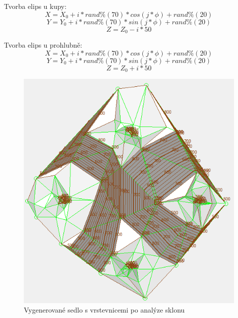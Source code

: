 \documentclass[a4paper,11pt,twoside]{article}
\begin{document}
Tvorba elips u kupy:
$$
X = X_0 + i * rand\%(70) * cos(j*\phi) + rand\%(20)
$$
$$
Y =  Y_0 + i * rand\%(70) * sin(j*\phi) + rand\%(20)
$$
$$
Z = Z_0 - i * 50
$$

Tvorba elips u prohlubně:
$$
X = X_0 + i * rand\%(70) * cos(j*\phi) + rand\%(20)
$$
$$
Y =  Y_0 + i * rand\%(70) * sin(j*\phi) + rand\%(20)
$$
$$
Z = Z_0 + i * 50
$$

\vspace{0.2cm}
\begin{figure}[hbt!] 
\begin{center}
\includegraphics[width=12cm]{pictures/saddle_panchromatic_slope.PNG} 
\caption[Vygenerovanéí sedlo s vrstevnicem po analýze sklonui]{Vygenerované sedlo s vrstevnicemi po analýze sklonu}
\label{fig:saddle_panchromatic_slope}
\end{center}
\end{figure}

\newpage
\vspace*{-1cm}
\end{document}
